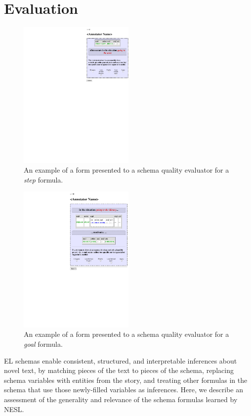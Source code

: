 \chapter{Evaluation}

\begin{figure}
    \centering
    \includegraphics[width=0.5\textwidth]{CH4_learning/evaleg3.pdf}
    \caption{An example of a form presented to a schema quality evaluator for a \textit{step} formula.}
    \label{fig:step_eval_eg}
\end{figure}

\begin{figure}
    \centering
    \includegraphics[width=0.5\textwidth]{CH4_learning/evaleg4.pdf}
    \caption{An example of a form presented to a schema quality evaluator for a \textit{goal} formula.}
    \label{fig:goal_eval_eg}
\end{figure}

EL schemas enable consistent, structured, and interpretable inferences about novel text, by matching pieces of the text to pieces of the schema, replacing schema variables with entities from the story, and treating other formulas in the schema that use those newly-filled variables as inferences. Here, we describe an assessment of the generality and relevance of the schema formulas learned by NESL.
